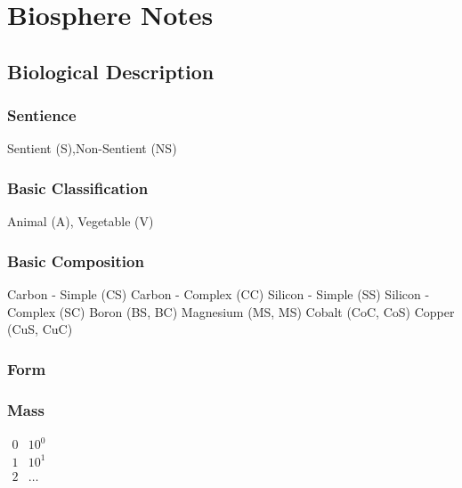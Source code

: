 \chapter{Biosphere Notes}
\section{Biological Description}

\subsection{Sentience}
Sentient (S),Non-Sentient (NS)

\subsection{Basic Classification}
Animal (A), Vegetable (V)

\subsection{Basic Composition}
Carbon - Simple (CS) 
Carbon - Complex (CC)
Silicon - Simple (SS)
Silicon - Complex (SC)
Boron (BS, BC)
Magnesium (MS, MS)
Cobalt (CoC, CoS)
Copper (CuS, CuC)

\subsection{Form}

\subsection{Mass}
    	\(
    	\begin{array}{ll}
		0		& 10^{0}  \\
		1		& 10^{1}  \\
		2		& \dots 
		\end{array}
        \)

